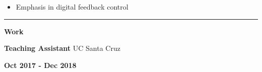 \documentclass[paper=a4,fontsize=11pt]{article} %
\def \sectionSpace      {0.3cm}     %
\def \leftColSpace      {0.1}       %
\def \middleColSpace    {0.71}      %
\def \bigMiddleColSpace {0.8}       %
\def \rightColSpace     {0.25}      %
\def \lineWidth         {20.25cm}   %
\def \lineThickness     {1pt}       %
\begin{document}
    \noindent
    \begin{minipage}[t]{\leftColSpace\linewidth}
        \hfill
    \end{minipage}
    \begin{minipage}[t]{\bigMiddleColSpace\linewidth}
        \begin{itemize}[noitemsep,topsep=0pt]
            \item Emphasis in digital feedback control
        \end{itemize}
    \end{minipage}
    \vspace{-0.275cm}

    \vspace{\sectionSpace}
    \noindent\rule{\lineWidth}{\lineThickness}

    \noindent
    \begin{minipage}[t]{\leftColSpace\linewidth}
        \noindent \textbf{Work}
    \end{minipage}
    \begin{minipage}[t]{\middleColSpace\linewidth}
        \noindent \textbf{Teaching Assistant} \quad UC Santa Cruz
    \end{minipage}
    \begin{minipage}[t]{\rightColSpace\linewidth}
        \noindent \textbf{Oct 2017 - Dec 2018}
    \end{minipage}
\end{document}
